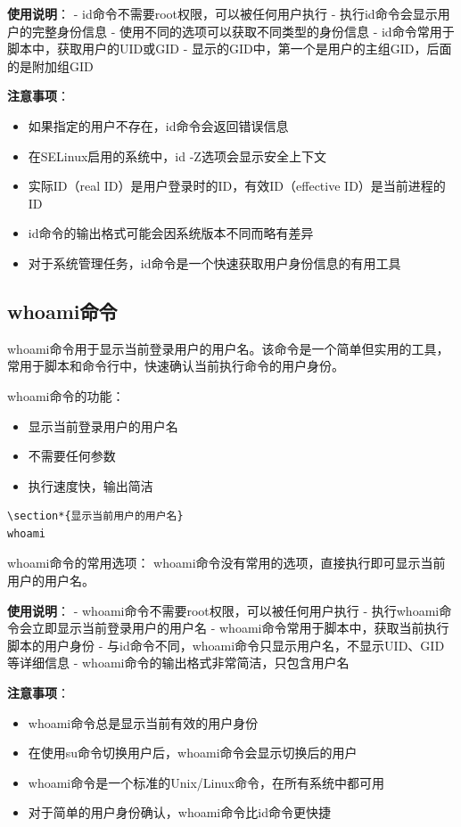 \documentclass[12pt,UTF8]{ctexbook}
\begin{document}
\textbf{使用说明}：
- id命令不需要root权限，可以被任何用户执行
- 执行id命令会显示用户的完整身份信息
- 使用不同的选项可以获取不同类型的身份信息
- id命令常用于脚本中，获取用户的UID或GID
- 显示的GID中，第一个是用户的主组GID，后面的是附加组GID

\textbf{注意事项}：
\begin{itemize}
    \item 如果指定的用户不存在，id命令会返回错误信息
    \item 在SELinux启用的系统中，id -Z选项会显示安全上下文
    \item 实际ID（real ID）是用户登录时的ID，有效ID（effective ID）是当前进程的ID
    \item id命令的输出格式可能会因系统版本不同而略有差异
    \item 对于系统管理任务，id命令是一个快速获取用户身份信息的有用工具
\end{itemize}

\subsection{whoami命令}
whoami命令用于显示当前登录用户的用户名。该命令是一个简单但实用的工具，常用于脚本和命令行中，快速确认当前执行命令的用户身份。

whoami命令的功能：
\begin{itemize}
    \item 显示当前登录用户的用户名
    \item 不需要任何参数
    \item 执行速度快，输出简洁
\end{itemize}

\begin{verbatim}
\section*{显示当前用户的用户名}
whoami
\end{verbatim}

whoami命令的常用选项：
whoami命令没有常用的选项，直接执行即可显示当前用户的用户名。

\textbf{使用说明}：
- whoami命令不需要root权限，可以被任何用户执行
- 执行whoami命令会立即显示当前登录用户的用户名
- whoami命令常用于脚本中，获取当前执行脚本的用户身份
- 与id命令不同，whoami命令只显示用户名，不显示UID、GID等详细信息
- whoami命令的输出格式非常简洁，只包含用户名

\textbf{注意事项}：
\begin{itemize}
    \item whoami命令总是显示当前有效的用户身份
    \item 在使用su命令切换用户后，whoami命令会显示切换后的用户
    \item whoami命令是一个标准的Unix/Linux命令，在所有系统中都可用
    \item 对于简单的用户身份确认，whoami命令比id命令更快捷
\end{itemize}
\end{document}
